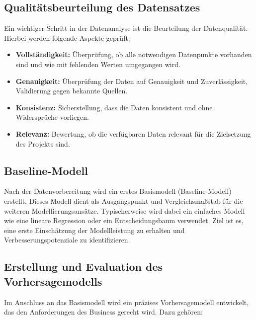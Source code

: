 \documentclass[%
pdftex,
oneside,			%
11pt,				%
parskip=half,		%
headheight = 12pt,	%
headsepline,		%
footsepline,		%
footheight = 16pt,	%
abstracton,		%
DIV=calc,		%
BCOR=8mm,		%
headinclude=false,	%
footinclude=false,	%
listof=totoc,		%
toc=bibliography,	%
]{scrreprt}	%
\begin{document}
        \subsection{Qualitätsbeurteilung des Datensatzes}
            
            Ein wichtiger Schritt in der Datenanalyse ist die Beurteilung der Datenqualität. 
            Hierbei werden folgende Aspekte geprüft:
            
            \begin{itemize}
                \item \textbf{Vollständigkeit:} Überprüfung, ob alle notwendigen Datenpunkte vorhanden sind und wie mit fehlenden Werten umgegangen wird.
                \item \textbf{Genauigkeit:} Überprüfung der Daten auf Genauigkeit und Zuverlässigkeit, Validierung gegen bekannte Quellen.
                \item \textbf{Konsistenz:} Sicherstellung, dass die Daten konsistent und ohne Widersprüche vorliegen.
                \item \textbf{Relevanz:} Bewertung, ob die verfügbaren Daten relevant für die Zielsetzung des Projekts sind.
            \end{itemize}
        
        \subsection{Baseline-Modell}
            
            Nach der Datenvorbereitung wird ein erstes Basismodell (Baseline-Modell) erstellt. 
            Dieses Modell dient als Ausgangspunkt und Vergleichsmaßstab für die weiteren Modellierungsansätze. 
            Typischerweise wird dabei ein einfaches Modell wie eine lineare Regression oder ein Entscheidungsbaum verwendet. 
            Ziel ist es, eine erste Einschätzung der Modellleistung zu erhalten und Verbesserungspotenziale zu identifizieren.
            
        \subsection{Erstellung und Evaluation des Vorhersagemodells}
            
            Im Anschluss an das Basismodell wird ein präzises Vorhersagemodell entwickelt, das den Anforderungen des Business gerecht wird. Dazu gehören:
            
\end{document}
